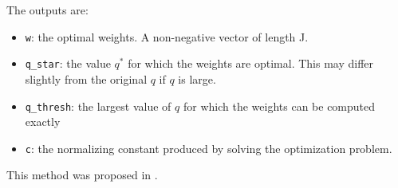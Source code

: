 \documentclass[english,11pt]{article} %
\begin{document}
The outputs are: 
\begin{itemize}
\item \verb+w+:  the optimal weights. A non-negative vector of length J.
\item \verb+q_star+: the value $q^*$ for which the weights are optimal. This may differ slightly from the original $q$ if $q$ is large.
\item \verb+q_thresh+: the largest value of $q$ for which the weights can be computed exactly 
\item \verb+c+:  the normalizing constant produced by solving the optimization problem.
\end{itemize}

This method was proposed in \cite{dobriban2015optimal}.



\end{document}
